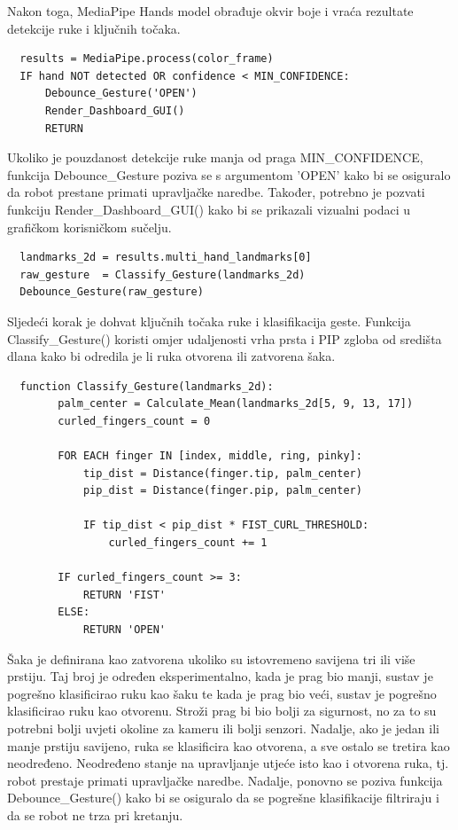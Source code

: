\documentclass[12pt,a4paper,oneside]{report}
\begin{document}
Nakon toga, MediaPipe Hands model obrađuje okvir boje i vraća rezultate detekcije ruke i ključnih točaka. 

\begin{verbatim}
  results = MediaPipe.process(color_frame)
  IF hand NOT detected OR confidence < MIN_CONFIDENCE:
      Debounce_Gesture('OPEN')
      Render_Dashboard_GUI()
      RETURN
\end{verbatim}

Ukoliko je pouzdanost detekcije ruke manja od praga MIN\_CONFIDENCE, funkcija Debounce\_Gesture poziva se s
argumentom 'OPEN' kako bi se osiguralo da robot prestane primati upravljačke naredbe. Također, potrebno je 
pozvati funkciju Render\_Dashboard\_GUI() kako bi se prikazali vizualni podaci u grafičkom korisničkom sučelju.

\begin{verbatim}
  landmarks_2d = results.multi_hand_landmarks[0]
  raw_gesture  = Classify_Gesture(landmarks_2d)
  Debounce_Gesture(raw_gesture)
\end{verbatim}

Sljedeći korak je dohvat ključnih točaka ruke i klasifikacija geste. Funkcija Classify\_Gesture() koristi
omjer udaljenosti vrha prsta i PIP zgloba od središta dlana kako bi odredila je li ruka otvorena ili 
zatvorena šaka. 

\begin{verbatim}
  function Classify_Gesture(landmarks_2d):
        palm_center = Calculate_Mean(landmarks_2d[5, 9, 13, 17])
        curled_fingers_count = 0

        FOR EACH finger IN [index, middle, ring, pinky]:
            tip_dist = Distance(finger.tip, palm_center)
            pip_dist = Distance(finger.pip, palm_center)

            IF tip_dist < pip_dist * FIST_CURL_THRESHOLD:
                curled_fingers_count += 1

        IF curled_fingers_count >= 3:
            RETURN 'FIST'
        ELSE:
            RETURN 'OPEN'
\end{verbatim}

Šaka je definirana kao zatvorena ukoliko su istovremeno savijena tri ili više prstiju. 
Taj broj je određen eksperimentalno, kada je prag bio manji, sustav je pogrešno klasificirao ruku kao šaku 
te kada je prag bio veći, sustav je pogrešno klasificirao ruku kao otvorenu. Stroži prag bi bio bolji za 
sigurnost, no za to su potrebni bolji uvjeti okoline za kameru ili bolji senzori.
Nadalje, ako je jedan ili manje prstiju savijeno, ruka se klasificira kao otvorena, a sve ostalo se tretira kao neodređeno. 
Neodređeno stanje na upravljanje utjeće isto kao i otvorena ruka, tj. robot prestaje primati upravljačke naredbe. 
Nadalje, ponovno se poziva funkcija Debounce\_Gesture() kako bi se osiguralo da se pogrešne 
klasifikacije filtriraju i da se robot ne trza pri kretanju. 
\end{document}
